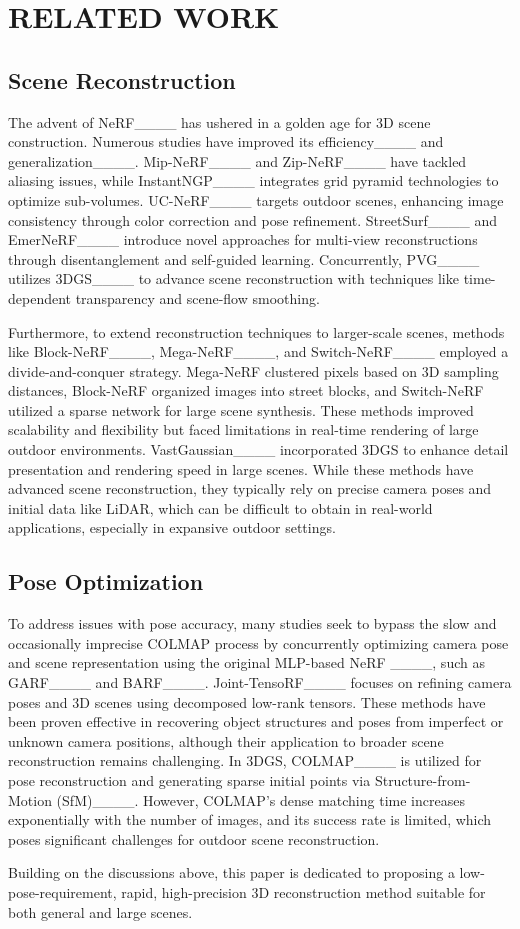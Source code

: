 \section{RELATED WORK}
\subsection{Scene Reconstruction}
The advent of NeRF____ has ushered in a golden age for 3D scene construction. Numerous studies have improved its efficiency____ and generalization____. Mip-NeRF____ and Zip-NeRF____ have tackled aliasing issues, while InstantNGP____ integrates grid pyramid technologies to optimize sub-volumes. UC-NeRF____ targets outdoor scenes, enhancing image consistency through color correction and pose refinement. StreetSurf____ and EmerNeRF____ introduce novel approaches for multi-view reconstructions through disentanglement and self-guided learning. Concurrently, PVG____ utilizes 3DGS____ to advance scene reconstruction with techniques like time-dependent transparency and scene-flow smoothing.

Furthermore, to extend reconstruction techniques to larger-scale scenes, methods like Block-NeRF____, Mega-NeRF____, and Switch-NeRF____ employed a divide-and-conquer strategy. Mega-NeRF clustered pixels based on 3D sampling distances, Block-NeRF organized images into street blocks, and Switch-NeRF utilized a sparse network for large scene synthesis. These methods improved scalability and flexibility but faced limitations in real-time rendering of large outdoor environments. VastGaussian____ incorporated 3DGS to enhance detail presentation and rendering speed in large scenes. While these methods have advanced scene reconstruction, they typically rely on precise camera poses and initial data like LiDAR, which can be difficult to obtain in real-world applications, especially in expansive outdoor settings.

\subsection{Pose Optimization}
To address issues with pose accuracy, many studies seek to bypass the slow and occasionally imprecise COLMAP process by concurrently optimizing camera pose and scene representation using the original MLP-based NeRF ____, such as GARF____ and BARF____. Joint-TensoRF____ focuses on refining camera poses and 3D scenes using decomposed low-rank tensors. These methods have been proven effective in recovering object structures and poses from imperfect or unknown camera positions, although their application to broader scene reconstruction remains challenging. In 3DGS, COLMAP____ is utilized for pose reconstruction and generating sparse initial points via Structure-from-Motion (SfM)____. However, COLMAP's dense matching time increases exponentially with the number of images, and its success rate is limited, which poses significant challenges for outdoor scene reconstruction.

Building on the discussions above, this paper is dedicated to proposing a low-pose-requirement, rapid, high-precision 3D reconstruction method suitable for both general and large scenes.